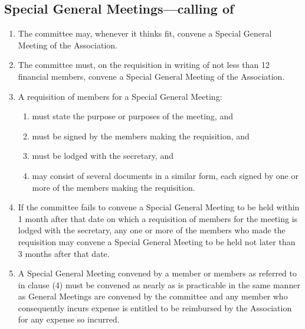 \subsection{Special General Meetings—calling of}
\begin{enumerate}
  \item The committee may, whenever it thinks fit, convene a Special General Meeting of the Association.
  \item The committee must, on the requisition in writing of not less than 12 financial members, convene a Special General Meeting of the Association.
  \item A requisition of members for a Special General Meeting:
    \begin{enumerate}
      \item must state the purpose or purposes of the meeting, and
      \item must be signed by the members making the requisition, and
      \item must be lodged with the secretary, and
      \item may consist of several documents in a similar form, each signed by one or more of the members making the requisition.
    \end{enumerate}
  \item If the committee fails to convene a Special General Meeting to be held within 1 month after that date on which a requisition of members for the meeting is lodged with the secretary, any one or more of the members who made the requisition may convene a Special General Meeting to be held not later than 3 months after that date.
  \item A Special General Meeting convened by a member or members as referred to in clause (4) must be convened as nearly as is practicable in the same manner as General Meetings are convened by the committee and any member who consequently incurs expense is entitled to be reimbursed by the Association for any expense so incurred.
\end{enumerate}
